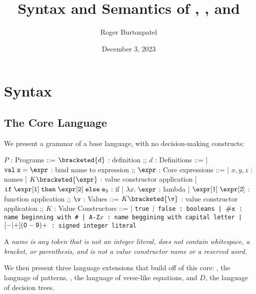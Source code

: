 \documentclass[]{article}
\title{Syntax and Semantics of \VMinus, \PPlus, and \D}
\author{Roger Burtonpatel}
\date{December 3, 2023}
\begin{document}
\maketitle

\section{Syntax}

\subsection{The Core Language}

We present a grammar of a base language, with no decision-making constructs: 

\bigskip

\begin{center}
    \begin{bnf}
    $P$ : \textsf{Programs} ::=
    $\bracketed{d}$ : definition
    ;;
    $d$ : \textsf{Definitions} ::=
    | $\tt{val} \; x \; \tt{=} \; \expr$ : bind name to expression
    ;;
    $\expr$ : Core expressions ::= 
    | $x, y, z$ : names
    | $K\bracketed{\expr}$ : value constructor application 
    | $\tt{if} \; \expr[1] \; \tt{then} \; \expr[2] \; \tt{else} \; e_{3} $ : if
    | $\lambda x. \; \expr$ : lambda 
    | $\expr[1] \; \expr[2]$ : function application 
    ;;
    $\v$ : Values ::= $K\bracketed{\v}$ : value constructor application 
    ;;
    $K$ : \textsf{Value Constructors} ::=
    | \tt{true} $\vert$ \tt{false} : booleans
    | $\tt{\#}x$ : name beginning with \tt{\#}
    | \tt{A-Z}$x$ : name beggining with capital letter
    | $[\tt{-}\vert\tt{+}](\tt{0}-\tt{9})+$ : signed integer literal 

    \end{bnf}
\end{center}


A \it{name} is any token that is not an integer literal, 
does not contain whitespace, a bracket, or parenthesis, 
and is not a value constructor name or a reserved word.


We then present three language extensions that build off of this core: 
\PPlus, the language of patterns, \VMinus, the language of 
verse-like equations, and $D$, the language of decision trees. 
\end{document}
